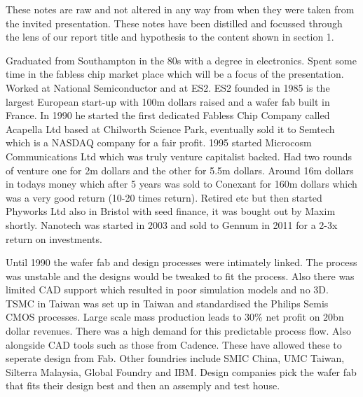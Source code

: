 {}
 \label{Notes}
These notes are raw and not altered in any way from when they were taken from the invited presentation. These notes have been distilled and focussed through the lens of our report title and hypothesis to the content shown in section 1.

Graduated from Southampton in the 80s with a degree in electronics. 
Spent some time in the fabless chip market place which will be a focus of the presentation. 
Worked at National Semiconductor and at ES2. 
ES2 founded in 1985 is the largest European start-up with 100m dollars raised and a wafer fab built in France. 
In 1990 he started the first dedicated Fabless Chip Company called Acapella Ltd based at Chilworth Science Park, eventually sold it to Semtech which is a NASDAQ company for a fair profit. 
1995 started Microcosm Communications Ltd which was truly venture capitalist backed.
 Had two rounds of venture one for 2m dollars and the other for 5.5m dollars. 
Around 16m dollars in todays money which after 5 years was sold to Conexant for 160m dollars which was a very good return (10-20 times return).
Retired etc but then started Phyworks Ltd also in Bristol with seed finance, it was bought out by Maxim shortly. 
Nanotech was started in 2003 and sold to Gennum in 2011 for a 2-3x return on investments.

Until 1990 the wafer fab and design processes were intimately linked. 
The process was unstable and the designs would be tweaked to fit the process. 
Also there was limited CAD support which resulted in poor simulation models and no 3D. 
TSMC in Taiwan was set up in Taiwan and standardised the Philips Semis CMOS processes.
 Large scale mass production leads to 30\% net profit on 20bn dollar revenues. 
There was a high demand for this predictable process flow. Also alongside CAD tools such as those from Cadence. 
These have allowed these to seperate design from Fab. Other foundries include SMIC China, UMC Taiwan, Silterra Malaysia, Global Foundry and IBM. 
Design companies pick the wafer fab that fits their design best and then an assemply and test house.

